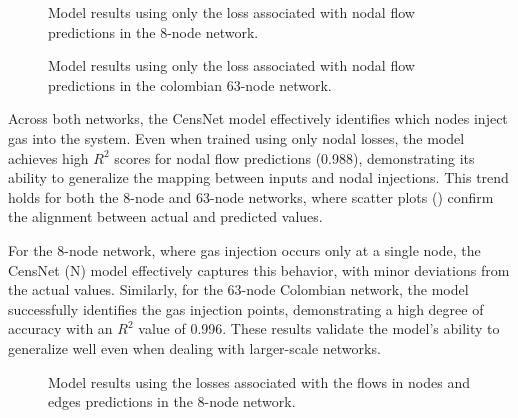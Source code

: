 \begin{figure}
    \centering
    \setlength{}        
    \setlength{} 
    
    \caption{Model results using only the loss associated with nodal flow predictions in the 8-node network.}
    \label{fig:dummy_base_results}
\end{figure}

\begin{figure}
    \centering
        \setlength{}        
        \setlength{} 
    \caption{Model results using only the loss associated with nodal flow predictions in the colombian 63-node network.}
    \label{fig:lineal_col_base_results}
\end{figure}

Across both networks, the CensNet model effectively identifies which nodes inject gas into the system. Even when trained using only nodal losses, the model achieves high $R^2$ scores for nodal flow predictions (0.988), demonstrating its ability to generalize the mapping between inputs and nodal injections. This trend holds for both the 8-node and 63-node networks, where scatter plots () confirm the alignment between actual and predicted values.

For the 8-node network, where gas injection occurs only at a single node, the CensNet (N) model effectively captures this behavior, with minor deviations from the actual values. Similarly, for the 63-node Colombian network, the model successfully identifies the gas injection points, demonstrating a high degree of accuracy with an $R^2$ value of 0.996. These results validate the model's ability to generalize well even when dealing with larger-scale networks.

\begin{figure}
    \centering
        \setlength{}        
        \setlength{} 
        \caption{Model results using the losses associated with the flows in nodes and edges predictions in the 8-node network.}
        \label{fig:dummy_base_f_results}
\end{figure}


